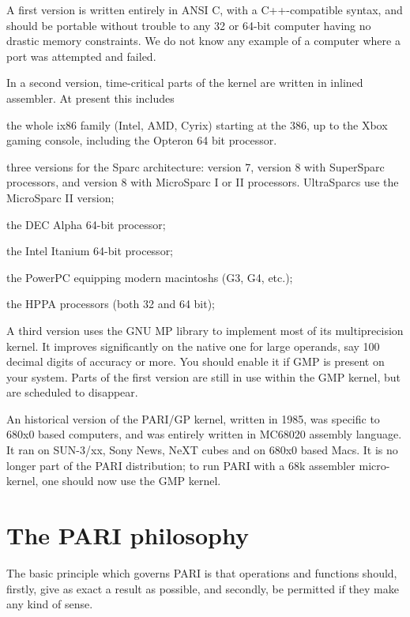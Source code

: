 A first version is written entirely in ANSI C, with a C++-compatible syntax,
and should be portable without trouble to any 32 or 64-bit computer having no
drastic memory constraints. We do not know any example of a computer where a
port was attempted and failed.

In a second version, time-critical parts of the kernel are written in
inlined assembler. At present this includes

\item the whole ix86 family (Intel, AMD, Cyrix) starting at the 386, up to
the Xbox gaming console, including the Opteron 64 bit processor.

\item three versions for the Sparc architecture: version 7, version 8 with
SuperSparc processors, and version 8 with MicroSparc I or II processors.
UltraSparcs use the MicroSparc II version;

\item the DEC Alpha 64-bit processor;

\item the Intel Itanium 64-bit processor;

\item the PowerPC equipping modern macintoshs (G3, G4, etc.);

\item the HPPA processors (both 32 and 64 bit);

A third version uses the GNU MP library to implement most of its
multiprecision kernel. It improves significantly on the native one for large
operands, say 100 decimal digits of accuracy or more. You should enable it if
GMP is present on your system. Parts of the first version are still in use
within the GMP kernel, but are scheduled to disappear.

An historical version of the PARI/GP kernel, written in 1985, was specific to
680x0 based computers, and was entirely written in MC68020 assembly language.
It ran on SUN-3/xx, Sony News, NeXT cubes and on 680x0 based Macs. It is no
longer part of the PARI distribution; to run PARI with a 68k assembler
micro-kernel, one should now use the GMP kernel.

\section{The PARI philosophy}
The basic principle which governs PARI is that operations and functions
should, firstly, give as exact a result as possible, and secondly, be
permitted if they make any kind of sense.

